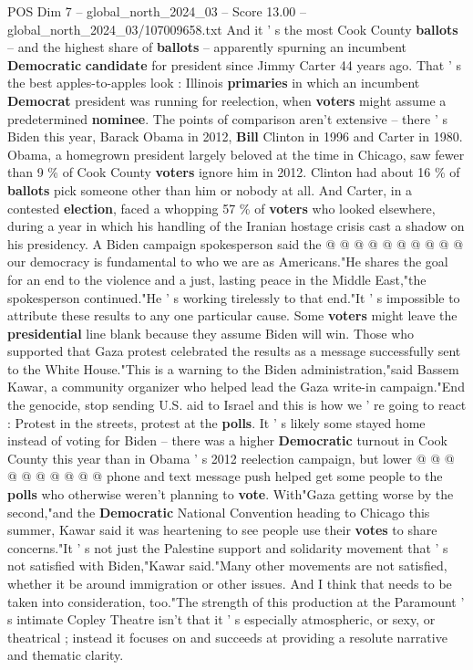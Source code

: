 \begin{textsample}{POS Dim 7 – global\_north\_2024\_03 – Score 13.00 – global\_north\_2024\_03/107009658.txt}
And it ' s the most Cook County \textbf{ballots} -- and the highest share of \textbf{ballots} -- apparently spurning an incumbent \textbf{Democratic} \textbf{candidate} for president since Jimmy Carter 44 years ago.
That ' s the best apples-to-apples look : Illinois \textbf{primaries} in which an incumbent \textbf{Democrat} president was running for reelection, when \textbf{voters} might assume a predetermined \textbf{nominee}.
The points of comparison aren't extensive -- there ' s Biden this year, Barack Obama in 2012, \textbf{Bill} Clinton in 1996 and Carter in 1980.
Obama, a homegrown president largely beloved at the time in Chicago, saw fewer than 9 \% of Cook County \textbf{voters} ignore him in 2012.
Clinton had about 16 \% of \textbf{ballots} pick someone other than him or nobody at all.
And Carter, in a contested \textbf{election}, faced a whopping 57 \% of \textbf{voters} who looked elsewhere, during a year in which his handling of the Iranian hostage crisis cast a shadow on his presidency.
A Biden campaign spokesperson said the @ @ @ @ @ @ @ @ @ @ our democracy is fundamental to who we are as Americans."He shares the goal for an end to the violence and a just, lasting peace in the Middle East,"the spokesperson continued."He ' s working tirelessly to that end."It ' s impossible to attribute these results to any one particular cause.
Some \textbf{voters} might leave the \textbf{presidential} line blank because they assume Biden will win.
Those who supported that Gaza protest celebrated the results as a message successfully sent to the White House."This is a warning to the Biden administration,"said Bassem Kawar, a community organizer who helped lead the Gaza write-in campaign."End the genocide, stop sending U.S. aid to Israel and this is how we ' re going to react : Protest in the streets, protest at the \textbf{polls}.
It ' s likely some stayed home instead of voting for Biden -- there was a higher \textbf{Democratic} turnout in Cook County this year than in Obama ' s 2012 reelection campaign, but lower @ @ @ @ @ @ @ @ @ @ phone and text message push helped get some people to the \textbf{polls} who otherwise weren't planning to \textbf{vote}.
With"Gaza getting worse by the second,"and the \textbf{Democratic} National Convention heading to Chicago this summer, Kawar said it was heartening to see people use their \textbf{votes} to share concerns."It ' s not just the Palestine support and solidarity movement that ' s not satisfied with Biden,"Kawar said."Many other movements are not satisfied, whether it be around immigration or other issues.
And I think that needs to be taken into consideration, too."The strength of this production at the Paramount ' s intimate Copley Theatre isn't that it ' s especially atmospheric, or sexy, or theatrical ; instead it focuses on and succeeds at providing a resolute narrative and thematic clarity.

\end{textsample}
